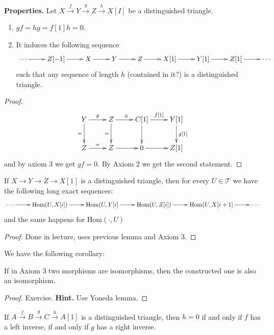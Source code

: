 {\bf Properties.} Let $X\xrightarrow{f}Y\xrightarrow{g}Z\xrightarrow{h}X[I]$ be
a distinguished triangle.

\begin{lemma}
\label{lemma-properties-of-distinguished-triangles}
\begin{enumerate}
\item $gf=hg=f[1]h=0$.
\item It induces the following sequence
$$
\xymatrix{ 
\cdots\ar[r]&Z[-1]\ar[r]& X\ar[r]& Y\ar[r]& Z\ar[r]&X[1]
\ar[r]&Y[1]\ar[r]& Z[1]\ar[r]&\cdots
}
$$
such that any sequence of length $h$ (contained in it?) is a distinguished
triangle.
\end{enumerate}
\end{lemma}

\begin{proof}
$$
\xymatrix{
Y\ar[r]^g\ar[d]_=& Z\ar[d]_=\ar[r]^h& C[1]\ar[r]^{f[1]}\ar[d]&
Y[1]\ar[d]^{g[1]}\\
Z\ar[r]^{=}&Z\ar[r]& 0\ar[r]&Z[1]
}
$$
and by axiom 3 we get $gf=0$. By Axiom 2 we get the second statement.
\end{proof}

\begin{lemma}
\label{lemma-long-exact-sequences-for-distinguished-triangles}
If $X \to Y \to Z \to X[1]$ is a distinguished triangle, then for every $U \in
\mathcal{T}$ we have the following long exact sequences:
$$
\xymatrix{
\cdots\ar[r]&\text{Hom}(U,X[i])\ar[r]&\text{Hom}(U,Y[i]\ar[r]&
\text{Hom}(U,Z[i])\ar[r]&\text{Hom}(U,X[i+1]\ar[r]&\cdots
}
$$
and the same happens for $\text{Hom}(\cdot,U)$
\end{lemma}

\begin{proof}
Done in lecture, uses previous lemma and Axiom 3.
\end{proof}

We have the following corollary:

\begin{lemma}
\label{lemma-two-isomorphisms-give-an-isomorphism}
If in Axiom 3 two morphisms are isomorphisms, then the constructed one is also
an isomorphism.
\end{lemma}

\begin{proof}
Exercise. {\bf Hint.} Use Yoneda lemma.
\end{proof}

\begin{exercise}
\label{exercise-inverses-in-distinguished-triangles}
If $A\xrightarrow{f}B\xrightarrow{g}C\xrightarrow{h}A[1]$ is a distinguished
triangle, then $h=0$ if and only if $f$ has a left inverse, if and only if $g$
has a right inverse. 
\end{exercise}

